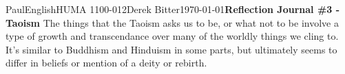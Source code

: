 \documentclass[12pt,letterpaper]{article}
\begin{document}
\begin{mla}{Paul}{English}{HUMA 1100-012}{Derek Bitter}{\today}{\textbf{Reflection Journal \#3 - Taoism}}
The things that the Taoism asks us to be, or what not to be involve
a type of growth and transcendance over many of the worldly things we
cling to. It's similar to Buddhism and Hinduism in some parts, but
ultimately seems to differ in beliefs or mention of a deity or rebirth.
  
  



\end{mla}
\end{document}
